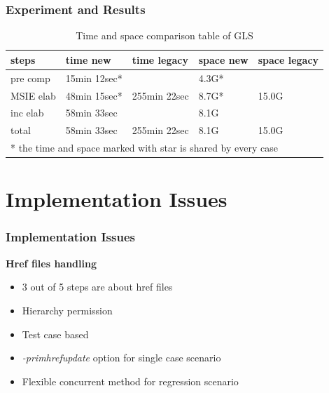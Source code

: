 \documentclass{beamer}
\begin{document}

\begin{frame}
  \frametitle{Experiment and Results}
  \begin{table}
    \centering
    \begin{tabular}{lllll}
      \toprule
      \textbf{steps} & \textbf{time new} & \textbf{time legacy} &  \textbf{space new} & \textbf{space legacy} \\
      \midrule
      pre comp & 15min 12sec* & \multirow{3}{*}{255min 22sec} & 4.3G* & \multirow{3}{*}{15.0G} \\
      \cline{1-2}\cline{4-4}
      MSIE elab & 48min 15sec* & & 8.7G* & \\
      \cline{1-2}\cline{4-4}
      inc elab & 58min 33sec & & 8.1G & \\
      \hline
      total & 58min 33sec & 255min 22sec & 8.1G & 15.0G \\
      \bottomrule
      \multicolumn{5}{l}{\footnotesize{* the time and space marked with star is shared by every case}}
    \end{tabular}
    \caption{Time and space comparison table of GLS}
  \end{table}
\end{frame}

\section{Implementation Issues}

\begin{frame}
  \frametitle{Implementation Issues}
  \textbf{Href files handling}
  \begin{itemize}
  \item 3 out of 5 steps are about href files
  \item Hierarchy permission
  \item Test case based
  \item \textit{-primhrefupdate} option for single case scenario
  \item Flexible concurrent method for regression scenario
  \end{itemize}
\end{frame}

\end{document}
